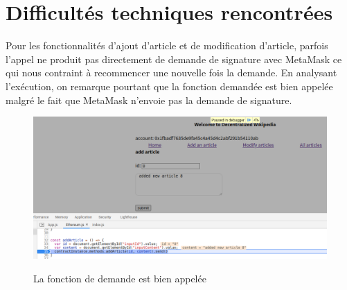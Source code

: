 \documentclass[14px]{article}
\begin{document}
\clearpage
\pagestyle{fancy}	
\rhead{\thepage}
\fancyfoot{}
\section{Difficultés techniques rencontrées}
Pour les fonctionnalités d'ajout d'article et de modification d'article, parfois l'appel ne produit pas directement de demande de signature avec MetaMask ce qui nous contraint à recommencer une nouvelle fois la demande. En analysant l'exécution, on remarque pourtant que la fonction demandée est bien appelée malgré le fait que MetaMask n'envoie pas la demande de signature.
	
    \begin{figure}[H]
		\begin{minipage}[H]{\linewidth}
			\centering
			\includegraphics[width=\textwidth]{bug.png}\\
			\caption{La fonction de demande est bien appelée}
			\label{img1}
		\end{minipage}
	\end{figure}
	
	
\end{document}
